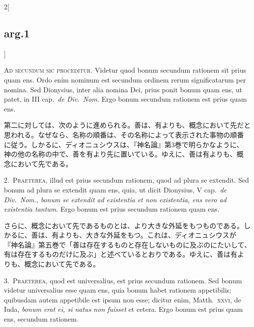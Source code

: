 \documentclass[paper=a4paper,fontsize=10pt,jafontsize=9pt,titlepage]{jlreq}
\begin{document}
\begin{paracol}{2}[\subsection{arg.1}]

{\huge A}{\scshape d secundum sic proceditur}. Videtur quod bonum
 secundum rationem sit prius quam ens. Ordo enim nominum est secundum
 ordinem rerum significatarum per nomina. Sed Dionysius, inter alia
 nomina Dei, prius ponit bonum quam ens, ut patet, in III cap.~{\itshape de
 Div.~Nom.} Ergo bonum secundum rationem est prius quam ens.

\switchcolumn

第二に対しては、次のように進められる。善は、有よりも、概念において先だと
 思われる。なぜなら、名称の順番は、その名称によって表示された事物の順番
 に従う。しかるに、ディオニュシウスは、『神名論』第3巻で明らかなように、
 神の他の名称の中で、善を有より先に置いている。ゆえに、善は有よりも、概
 念において先である。


2.~{\scshape Praeterea}, illud est prius secundum rationem, quod ad
 plura se extendit. Sed bonum ad plura se extendit quam ens, quia, ut
 dicit Dionysius, V cap.~{\itshape de Div.~Nom.}, {\itshape bonum se
 extendit ad existentia et non existentia, ens vero ad existentia
 tantum}. Ergo bonum est prius secundum rationem quam ens.

\switchcolumn

さらに、概念において先であるものとは、より大きな外延をもつものである。し
 かるに、善は、有よりも、大きな外延をもつ。これは、ディオニュシウスが
 『神名論』第五巻で「善は存在するものと存在しないものに及ぶのにたいして、
 有は存在するものだけに及ぶ」と述べているとおりである。ゆえに、善は有よ
 りも、概念において先である。


3.~{\scshape Praeterea}, quod est universalius, est prius secundum
 rationem. Sed bonum videtur universalius esse quam ens, quia bonum
 habet rationem appetibilis; quibusdam autem appetibile est ipsum non
 esse; dicitur enim, Matth.~{\scshape xxvi}, de Iuda, {\itshape bonum
 erat ei, si natus non fuisset} et cetera. Ergo bonum est prius quam
 ens, secundum rationem.


\end{paracol}
\end{document}

